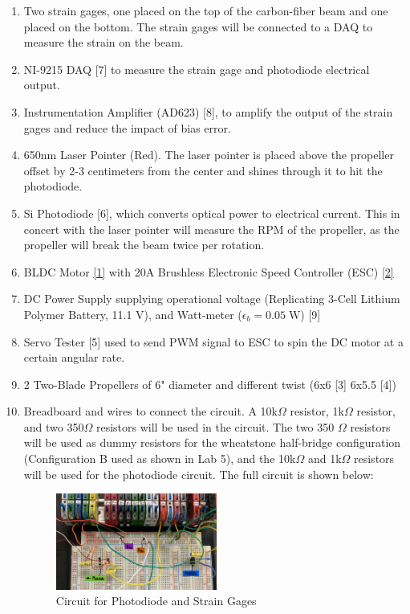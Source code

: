\documentclass{article}
\begin{document}
\begin{enumerate}
  \item Two strain gages, one placed on the top of the carbon-fiber beam and one placed on the bottom. The strain gages will be connected to a DAQ to measure the strain on the beam.
  \item NI-9215 DAQ \hypertarget{7}{[7]} to measure the strain gage and photodiode electrical output.
  \item Instrumentation Amplifier (AD623) \hypertarget{8}{[8]}, to amplify the output of the strain gages and reduce the impact of bias error.
  \item 650nm Laser Pointer (Red). The laser pointer is placed above the propeller offset by 2-3 centimeters from the center and shines through it to hit the photodiode.
  \item Si Photodiode \hypertarget{6}{[6]}, which converts optical power to electrical current. This in concert with the laser pointer will measure the RPM of the propeller, as the propeller will break the beam twice per rotation.
  \item BLDC Motor \hyperlink{1}{[1]} with 20A Brushless Electronic Speed Controller (ESC) \hyperlink{2}{[2]} 
  \item DC Power Supply supplying operational voltage (Replicating 3-Cell Lithium Polymer Battery, 11.1 V), and Watt-meter (\(\epsilon_{b} = 0.05\; \text{W}\)) \hypertarget{9}{[9]}
  \item Servo Tester \hypertarget{5}{[5]} used to send PWM signal to ESC to spin the DC motor at a certain angular rate.
  \item 2 Two-Blade Propellers of 6" diameter and different twist (6x6 \hypertarget{3}{[3]} 6x5.5 \hypertarget{4}{[4]})
  \item Breadboard and wires to connect the circuit. A 10k$\Omega$ resistor, 1k$\Omega$ resistor, and two 350$\Omega$ resistors will be used in the circuit. The two 350 $\Omega$ resistors will be used as dummy resistors for the wheatstone half-bridge configuration (Configuration B used as shown in Lab 5), and the 10k$\Omega$ and 1k$\Omega$ resistors will be used for the photodiode circuit. The full circuit is shown below:
  \vspace{1mm}

  \begin{figure}[H]
    \centering
    \includegraphics[width = 0.5\textwidth]{finalprojectimages/finalsetupcircuit.jpg}
    \caption{Circuit for Photodiode and Strain Gages}
    \label{fig:finalsetupcircuit}
  \end{figure}

\end{enumerate}
\end{document}
